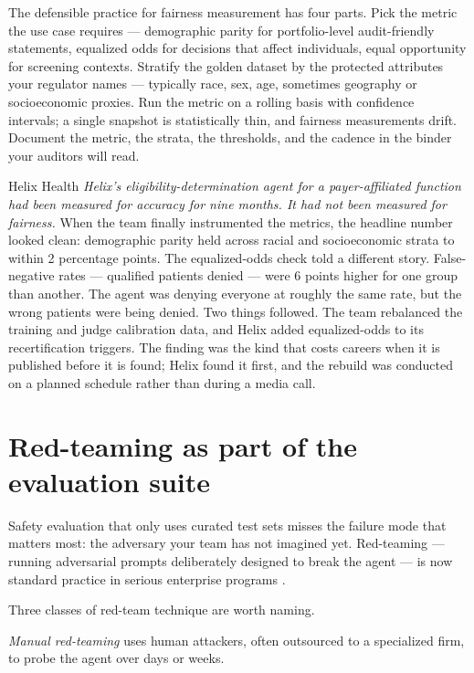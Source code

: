 The defensible practice for fairness measurement has four parts. Pick the metric the use case requires --- demographic parity for portfolio-level audit-friendly statements, equalized odds for decisions that affect individuals, equal opportunity for screening contexts. Stratify the golden dataset by the protected attributes your regulator names --- typically race, sex, age, sometimes geography or socioeconomic proxies. Run the metric on a rolling basis with confidence intervals; a single snapshot is statistically thin, and fairness measurements drift. Document the metric, the strata, the thresholds, and the cadence in the binder your auditors will read.

\begin{TNinpractice}{Helix Health}
\textit{Helix's eligibility-determination agent for a payer-affiliated function had been measured for accuracy for nine months. It had not been measured for fairness.} When the team finally instrumented the metrics, the headline number looked clean: demographic parity held across racial and socioeconomic strata to within 2 percentage points. The equalized-odds check told a different story. False-negative rates --- qualified patients denied --- were 6 points higher for one group than another. The agent was denying everyone at roughly the same rate, but the wrong patients were being denied. Two things followed. The team rebalanced the training and judge calibration data, and Helix added equalized-odds to its recertification triggers. The finding was the kind that costs careers when it is published before it is found; Helix found it first, and the rebuild was conducted on a planned schedule rather than during a media call.
\end{TNinpractice}

\section{Red-teaming as part of the evaluation suite}

Safety evaluation that only uses curated test sets misses the failure mode that matters most: the adversary your team has not imagined yet. Red-teaming --- running adversarial prompts deliberately designed to break the agent --- is now standard practice in serious enterprise programs \citep{perez2022redteam}.

Three classes of red-team technique are worth naming.

\textit{Manual red-teaming} uses human attackers, often outsourced to a specialized firm, to probe the agent over days or weeks.


